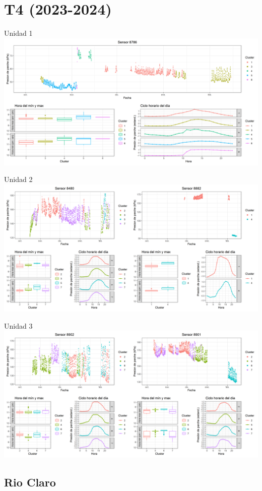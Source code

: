 \documentclass[
  letterpaper,
  DIV=11,
  numbers=noendperiod]{scrreprt}
\begin{document}
\chapter{T4 (2023-2024)}

Unidad 1
\includegraphics{figuras/02_turgor_limpiado/2023_2024_La_Esperanza_T4_Unidad_1.png}

Unidad 2
\includegraphics{figuras/02_turgor_limpiado/2023_2024_La_Esperanza_T4_Unidad_2.png}

Unidad 3
\includegraphics{figuras/02_turgor_limpiado/2023_2024_La_Esperanza_T4_Unidad_3.png}

\section{Rio Claro}\label{rio-claro-2}
\end{document}

